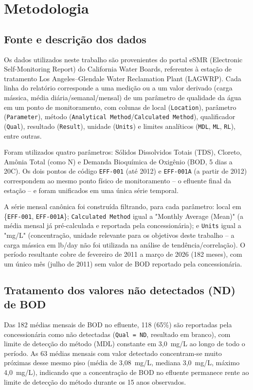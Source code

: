 \section{Metodologia}

\subsection{Fonte e descrição dos dados}

Os dados utilizados neste trabalho são provenientes do portal eSMR (Electronic Self-Monitoring Report) do California Water Boards, referentes à estação de tratamento Los Angeles--Glendale Water Reclamation Plant (LAGWRP). Cada linha do relatório corresponde a uma medição ou a um valor derivado (carga mássica, média diária/semanal/mensal) de um parâmetro de qualidade da água em um ponto de monitoramento, com colunas de local (\texttt{Location}), parâmetro (\texttt{Parameter}), método (\texttt{Analytical Method}/\texttt{Calculated Method}), qualificador (\texttt{Qual}), resultado (\texttt{Result}), unidade (\texttt{Units}) e limites analíticos (\texttt{MDL}, \texttt{ML}, \texttt{RL}), entre outras.

Foram utilizados quatro parâmetros: Sólidos Dissolvidos Totais (TDS), Cloreto, Amônia Total (como N) e Demanda Bioquímica de Oxigênio (BOD, 5 dias a 20\textdegree{}C). Os dois pontos de código \texttt{EFF-001} (até 2012) e \texttt{EFF-001A} (a partir de 2012) correspondem ao mesmo ponto físico de monitoramento -- o efluente final da estação -- e foram unificados em uma única série temporal.

A série mensal canônica foi construída filtrando, para cada parâmetro: local em \{\texttt{EFF-001}, \texttt{EFF-001A}\}; \texttt{Calculated Method} igual a "Monthly Average (Mean)" (a média mensal já pré-calculada e reportada pela concessionária); e \texttt{Units} igual a "mg/L" (concentração, unidade relevante para os objetivos deste trabalho -- a carga mássica em lb/day não foi utilizada na análise de tendência/correlação). O período resultante cobre de fevereiro de 2011 a março de 2026 (182 meses), com um único mês (julho de 2011) sem valor de BOD reportado pela concessionária.

\subsection{Tratamento dos valores não detectados (ND) de BOD}

Das 182 médias mensais de BOD no efluente, 118 (65\%) são reportadas pela concessionária como não detectadas (\texttt{Qual = ND}, resultado em branco), com limite de detecção do método (MDL) constante em 3,0~mg/L ao longo de todo o período. As 63 médias mensais com valor detectado concentram-se muito próximas desse mesmo piso (média de 3,08~mg/L, mediana 3,0~mg/L, máximo 4,0~mg/L), indicando que a concentração de BOD no efluente permanece rente ao limite de detecção do método durante os 15 anos observados.

